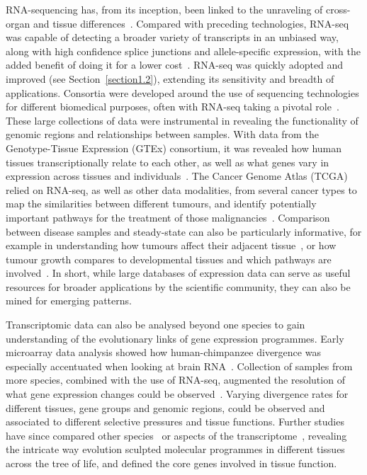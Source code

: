RNA-sequencing has, from its inception, been linked to the unraveling of cross-organ and tissue differences~\citep{mortazavi_mapping_2008}. Compared with preceding technologies, RNA-seq was capable of detecting a broader variety of transcripts in an unbiased way, along with high confidence splice junctions and allele-specific expression, with the added benefit of doing it for a lower cost~\citep{wang_rna-seq:_2009}. RNA-seq was quickly adopted and improved (see Section~\ref{section1.2}), extending its sensitivity and breadth of applications. Consortia were developed around the use of sequencing technologies for different biomedical purposes, often with RNA-seq taking a pivotal role~\citep{the_cancer_genome_atlas_research_network_cancer_2013,the_encode_project_consortium_integrated_2012,lonsdale_genotype-tissue_2013}. These large collections of data were instrumental in revealing the functionality of genomic regions and relationships between samples. With data from the Genotype-Tissue Expression (GTEx) consortium, it was revealed how human tissues transcriptionally relate to each other, as well as what genes vary in expression across tissues and individuals~\citep{mele_human_2015}. The Cancer Genome Atlas (TCGA) relied on RNA-seq, as well as other data modalities, from several cancer types to map the similarities between different tumours, and identify potentially important pathways for the treatment of those malignancies~\citep{hoadley_cell--origin_2018}. Comparison between disease samples and steady-state can also be particularly informative, for example in understanding how tumours affect their adjacent tissue~\citep{aran_comprehensive_2017}, or how tumour growth compares to developmental tissues and which pathways are involved~\citep{young_single-cell_2018}. In short, while large databases of expression data can serve as useful resources for broader applications by the scientific community, they can also be mined for emerging patterns.

Transcriptomic data can also be analysed beyond one species to gain understanding of the evolutionary links of gene expression programmes. Early microarray data analysis showed how human-chimpanzee divergence was especially accentuated when looking at brain RNA~\citep{enard_intra-_2002}. Collection of samples from more species, combined with the use of RNA-seq, augmented the resolution of what gene expression changes could be observed~\citep{brawand_evolution_2011}. Varying divergence rates for different tissues, gene groups and genomic regions, could be observed and associated to different selective pressures and tissue functions. Further studies have since compared other species~\citep{li_comparison_2014} or aspects of the transcriptome~\citep{barbosa-morais_evolutionary_2012}, revealing the intricate way evolution sculpted molecular programmes in different tissues across the tree of life, and defined the core genes involved in tissue function. 

